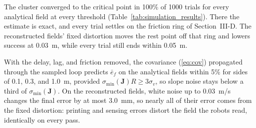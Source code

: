 \documentclass[lettersize,journal]{IEEEtran}
\newcommand{\rev}[1]{#1}
\begin{document}
 The cluster converged to the critical point in \rev{100}\% of 1000 trials for every analytical field at every threshold (Table~\ref{tab:simulation_results}). There the estimate is exact, and every trial settles on the friction ring of Section~III-D. The reconstructed fields' fixed distortion moves the rest point off that ring and lowers success at 0.03~m, while every trial still ends within 0.05~m.

With the delay, lag, and friction removed, the covariance (\ref{eq:cov}) propagated through the sampled loop predicts $\bar{e}_f$ on the analytical fields within \rev{5}\% for sides of 0.1, 0.3, and 1.0~m, provided $\sigma_{\min}(\mathbf{J})R \ge 3\sigma_v$, so slope noise stays below a third of $\sigma_{\min}(\mathbf{J})$. On the reconstructed fields, white noise up to 0.03~m/s changes the final error by at most \rev{3.0}~mm, so nearly all of their error comes from the fixed distortion: printing and sensing errors distort the field the robots read, identically on every pass.
\end{document}

